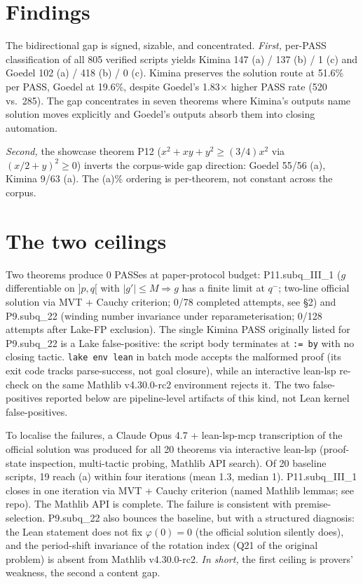 \documentclass{easychair}
\begin{document}
\section{Findings}

The bidirectional gap is signed, sizable, and concentrated. \emph{First,} per-PASS classification of all 805 verified scripts yields Kimina 147 (a) / 137 (b) / 1 (c) and Goedel 102 (a) / 418 (b) / 0 (c). Kimina preserves the solution route at 51.6\% per PASS, Goedel at 19.6\%, despite Goedel's 1.83$\times$ higher PASS rate (520 vs.\ 285). The gap concentrates in seven theorems where Kimina's outputs name solution moves explicitly and Goedel's outputs absorb them into closing automation.

\emph{Second,} the showcase theorem P12 ($x^2+xy+y^2 \geq (3/4)x^2$ via $(x/2+y)^2 \geq 0$) inverts the corpus-wide gap direction: Goedel 55/56 (a), Kimina 9/63 (a). The (a)\% ordering is per-theorem, not constant across the corpus.

\section{The two ceilings}

Two theorems produce 0 PASSes at paper-protocol budget: P11.subq\_III\_1 ($g$ differentiable on $]p,q[$ with $|g'| \leq M \Rightarrow g$ has a finite limit at $q^-$; two-line official solution via MVT + Cauchy criterion; 0/78 completed attempts, see \S2) and P9.subq\_22 (winding number invariance under reparameterisation; 0/128 attempts after Lake-FP exclusion). The single Kimina PASS originally listed for P9.subq\_22 is a Lake false-positive: the script body terminates at \texttt{:= by} with no closing tactic. \texttt{lake env lean} in batch mode accepts the malformed proof (its exit code tracks parse-success, not goal closure), while an interactive lean-lsp re-check on the same Mathlib v4.30.0-rc2 environment rejects it. The two false-positives reported below are pipeline-level artifacts of this kind, not Lean kernel false-positives.

To localise the failures, a Claude Opus 4.7 + lean-lsp-mcp transcription of the official solution was produced for all 20 theorems via interactive lean-lsp (proof-state inspection, multi-tactic probing, Mathlib API search). Of 20 baseline scripts, 19 reach (a) within four iterations (mean 1.3, median 1). P11.subq\_III\_1 closes in one iteration via MVT + Cauchy criterion (named Mathlib lemmas; see repo). The Mathlib API is complete. The failure is consistent with premise-selection. P9.subq\_22 also bounces the baseline, but with a structured diagnosis: the Lean statement does not fix $\varphi(0) = 0$ (the official solution silently does), and the period-shift invariance of the rotation index (Q21 of the original problem) is absent from Mathlib v4.30.0-rc2. \emph{In short,} the first ceiling is provers' weakness, the second a content gap.
\end{document}
